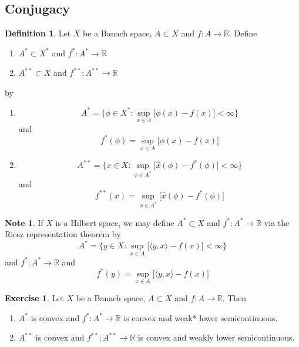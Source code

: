 \documentclass[12pt]{amsart}
\theoremstyle{definition}
\newtheorem{defn}[definition]{Definition}
\newtheorem{note}[definition]{Note}
\newtheorem{ex}[definition]{Exercise}
\newcommand{\R}{\mathbb{R}}
\renewcommand{\r}{\rangle}
\renewcommand{\l}{\langle}
\newcommand{\lex}[1]{\label{ex:#1}}
\newcommand{\ld}[1]{\label{defn:#1}}
\begin{document}
	\newpage 
	\subsection{Conjugacy}
	
	\begin{defn} \ld{}
	Let $X$ be a Banach space, $A \subset X$ and $f:A \rightarrow \R$. Define 
	\begin{enumerate}
		\item $A^* \subset X^*$ and $f^*: A^* \rightarrow \R$ 
		\item $A^{**} \subset X$ and $f^{**}:A^{**} \rightarrow \R$
	\end{enumerate}
	by 
	\begin{enumerate}
		\item $$A^* = \bigg \{\phi \in X^*: \sup_{x \in A} \bigg[ \phi(x) - f(x) \bigg] < \infty \bigg  \}$$ and $$f^*(\phi) = \sup_{x \in A} \bigg[ \phi(x) - f(x) \bigg] $$  
		\item $$A^{**} = \bigg \{x \in X: \sup_{\phi \in A^*} \bigg[ \hat{x}(\phi) - f^*(\phi) \bigg] < \infty \bigg \}$$ and $$f^{**}(x) = \sup_{\phi \in A^*} \bigg[ \hat{x}(\phi) - f^*(\phi) \bigg]$$
	\end{enumerate}
	\end{defn} 

	\begin{note}
		If $X$ is a Hilbert space, we may define $A^* \subset X$ and $f^*: A^* \rightarrow \R$ via the Riesz representation theorem by $$A^* = \bigg \{y \in X: \sup_{x \in A} \bigg[ \l y, x \r - f(x) \bigg] < \infty \bigg  \}$$ and $f^*: A^* \rightarrow \R$ and $$ f^*(y) = \sup_{x \in A} \bigg[ \l y, x \r - f(x) \bigg] $$
	\end{note}
	
	\begin{ex} \lex{}
	Let $X$ be a Banach space, $A \subset X$ and $f:A \rightarrow \R$. Then 
	\begin{enumerate}
		\item $A^*$ is convex and $f^*:A^* \rightarrow \R$ is convex and weak* lower semicontinuous.
		\item $A^{**}$ is convex and $f^{**}:A^{**} \rightarrow \R$ is convex and weakly lower semicontinuous.
	\end{enumerate} 
	\end{ex}
	
\end{document}
